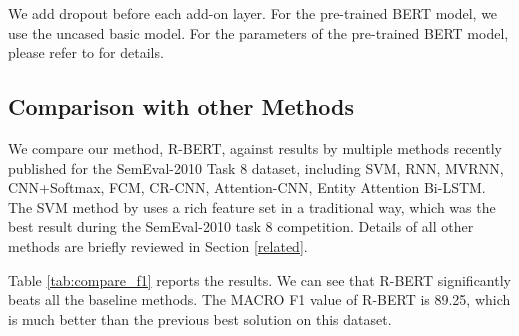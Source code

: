 \documentclass[11pt]{article}
\providecommand{\cite}[1]{\citeauthoryear{#1}}
\renewcommand{\cite}{\citep}
\begin{document}
We add dropout before each add-on layer. 
For the pre-trained BERT model, we use the uncased basic model. 
For the parameters of the pre-trained BERT model, please refer
to \cite{bert_Jacobv_corr_bert_2018} for details. 

\subsection{Comparison with other Methods} \label{sec:compare}

We compare our method, R-BERT, against
results by multiple methods recently published for the SemEval-2010
Task 8 dataset, including SVM, RNN, MVRNN, CNN+Softmax, FCM, CR-CNN, Attention-CNN, Entity Attention Bi-LSTM.
The SVM method by \cite{Rink_Semantic_2010} 
uses a rich feature set in a traditional way,
which was the best result
during the SemEval-2010 task 8 competition. 
Details of all other methods are briefly reviewed in Section \ref{related}.

Table \ref{tab:compare_f1} reports the results. We can see that
R-BERT significantly beats all the baseline methods. The MACRO F1 value
of R-BERT is 89.25, which
is much better than the previous best solution on this dataset.
\end{document}
